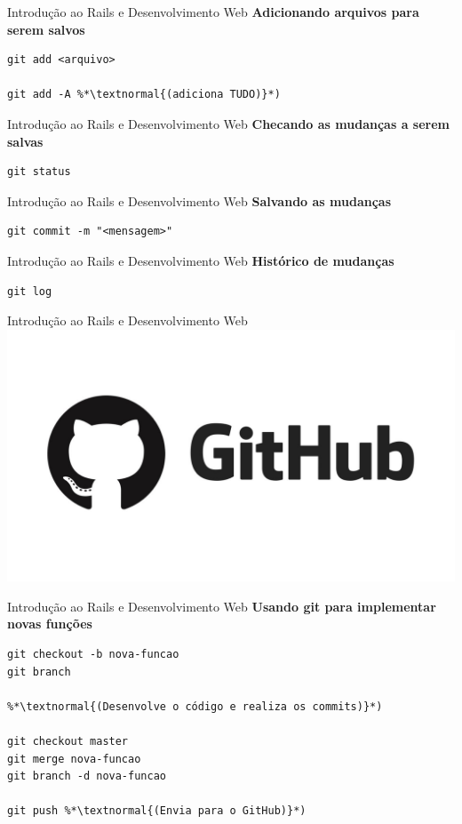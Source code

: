 \documentclass[10pt]{beamer}
\begin{document}
\begin{frame}[fragile]{Introdução ao Rails e Desenvolvimento Web}
  \huge
  \textbf{Adicionando arquivos para serem salvos}
  \vfill
  \LARGE
  \begin{lstlisting}
git add <arquivo>

git add -A %*\textnormal{(adiciona TUDO)}*)
  \end{lstlisting}
\end{frame}

\begin{frame}[fragile]{Introdução ao Rails e Desenvolvimento Web}
  \huge
  \textbf{Checando as mudanças a serem salvas}
  \vfill
  \LARGE
  \begin{lstlisting}
git status
  \end{lstlisting}
\end{frame}

\begin{frame}[fragile]{Introdução ao Rails e Desenvolvimento Web}
  \huge
  \textbf{Salvando as mudanças}
  \vfill
  \LARGE
  \begin{lstlisting}
git commit -m "<mensagem>"
  \end{lstlisting}
\end{frame}

\begin{frame}[fragile]{Introdução ao Rails e Desenvolvimento Web}
  \huge
  \textbf{Histórico de mudanças}
  \vfill
  \LARGE
  \begin{lstlisting}
git log
  \end{lstlisting}
\end{frame}

\begin{frame}{Introdução ao Rails e Desenvolvimento Web}
  \huge
  \includegraphics[width=\textwidth]{images/github.jpg}
\end{frame}

\begin{frame}[fragile]{Introdução ao Rails e Desenvolvimento Web}
  \huge
  \textbf{Usando git para implementar novas funções}
  \vfill
  \large
  \begin{lstlisting}
git checkout -b nova-funcao
git branch

%*\textnormal{(Desenvolve o código e realiza os commits)}*)

git checkout master
git merge nova-funcao
git branch -d nova-funcao

git push %*\textnormal{(Envia para o GitHub)}*)
  \end{lstlisting}
\end{frame}
\end{document}
